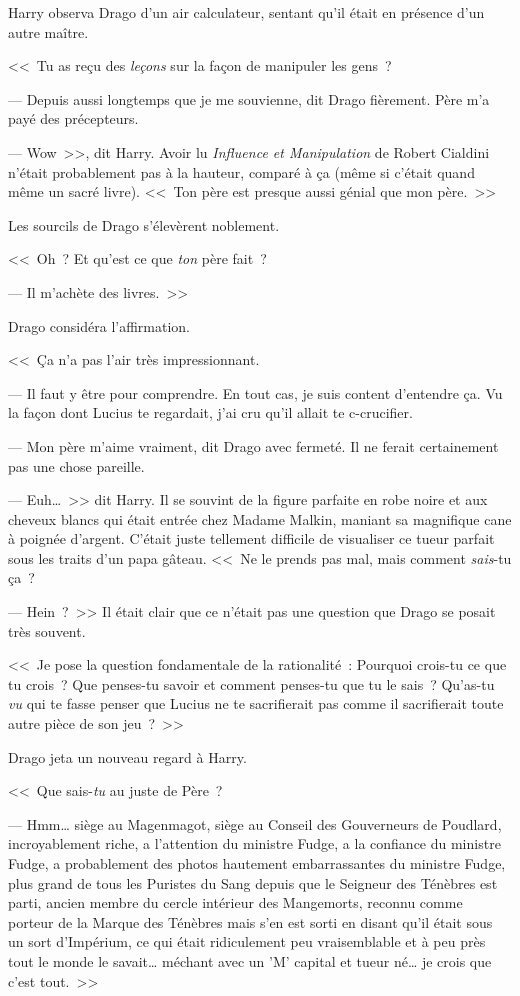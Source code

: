 Harry observa Drago d'un air calculateur, sentant qu'il était en présence d'un autre maître.

<<~Tu as reçu des \emph{leçons} sur la façon de manipuler les gens~?

--- Depuis aussi longtemps que je me souvienne, dit Drago fièrement. Père m'a payé des précepteurs.

--- Wow~>>, dit Harry. Avoir lu \emph{Influence et Manipulation} de Robert Cialdini n'était probablement pas à la hauteur, comparé à ça (même si c'était quand même un sacré livre). <<~Ton père est presque aussi génial que mon père.~>>

Les sourcils de Drago s'élevèrent noblement.

<<~Oh~? Et qu'est ce que \emph{ton} père fait~?

--- Il m'achète des livres.~>>

Drago considéra l'affirmation.

<<~Ça n'a pas l'air très impressionnant.

--- Il faut y être pour comprendre. En tout cas, je suis content d'entendre ça. Vu la façon dont Lucius te regardait, j'ai cru qu'il allait te c-crucifier.

--- Mon père m'aime vraiment, dit Drago avec fermeté. Il ne ferait certainement pas une chose pareille.

--- Euh…~>> dit Harry. Il se souvint de la figure parfaite en robe noire et aux cheveux blancs qui était entrée chez Madame Malkin, maniant sa magnifique cane à poignée d'argent. C'était juste tellement difficile de visualiser ce tueur parfait sous les traits d'un papa gâteau. <<~Ne le prends pas mal, mais comment \emph{sais}-tu ça~?

--- Hein~?~>> Il était clair que ce n'était pas une question que Drago se posait très souvent.

<<~Je pose la question fondamentale de la rationalité~: Pourquoi crois-tu ce que tu crois~? Que penses-tu savoir et comment penses-tu que tu le sais~? Qu'as-tu \emph{vu} qui te fasse penser que Lucius ne te sacrifierait pas comme il sacrifierait toute autre pièce de son jeu~?~>>

Drago jeta un nouveau regard à Harry.

<<~Que sais-\emph{tu} au juste de Père~?

--- Hmm… siège au Magenmagot, siège au Conseil des Gouverneurs de Poudlard, incroyablement riche, a l'attention du ministre Fudge, a la confiance du ministre Fudge, a probablement des photos hautement embarrassantes du ministre Fudge, plus grand de tous les Puristes du Sang depuis que le Seigneur des Ténèbres est parti, ancien membre du cercle intérieur des Mangemorts, reconnu comme porteur de la Marque des Ténèbres mais s'en est sorti en disant qu'il était sous un sort d'Impérium, ce qui était ridiculement peu vraisemblable et à peu près tout le monde le savait… méchant avec un 'M' capital et tueur né… je crois que c'est tout.~>>

